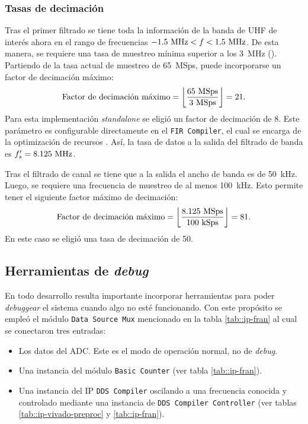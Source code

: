 \documentclass[../../main.tex]{subfiles}
\begin{document}
\subsubsection{Tasas de decimación}
Tras el primer filtrado se tiene toda la información de la banda de UHF de interés ahora en el rango de frecuencias $-1.5~\textrm{MHz}<f<1.5~\textrm{MHz}$. De esta manera, se requiere una tasa de muestreo mínima superior a los 3~MHz (\cite{teorema-del-muestreo}). Partiendo de la tasa actual de muestreo de 65~MSps, puede incorporarse un factor de decimación máximo:
\[\textrm{Factor de decimación máximo} = \left\lfloor\frac{65~\textrm{MSps}}{3~\textrm{MSps}}\right\rfloor = 21.\]
Para esta implementación \textit{standalone} se eligió un factor de decimación de 8. Este parámetro es configurable directamente en el \texttt{FIR Compiler}, el cual se encarga de la optimización de recursos \cite{fir-compiler}. Así, la tasa de datos a la salida del filtrado de banda es $f'_s = 8.125~\textrm{MHz}$.

Tras el filtrado de canal se tiene que a la salida el ancho de banda es de 50~kHz. Luego, se requiere una frecuencia de muestreo de al menos 100~kHz. Esto permite tener el siguiente factor máximo de decimación:
\[\textrm{Factor de decimación máximo} = \left\lfloor\frac{8.125~\textrm{MSps}}{100~\textrm{kSps}}\right\rfloor = 81.\] En este caso se eligió una tasa de decimación de 50.


\subsection{Herramientas de \textit{debug}}\label{subsec::debug-preproc-inicial}
En todo desarrollo resulta importante incorporar herramientas para poder \textit{debuggear} el sistema cuando algo no esté funcionando. Con este propósito se empleó el módulo \texttt{Data Source Mux} mencionado en la tabla \ref{tab::ip-fran} al cual se conectaron tres entradas:
\begin{itemize}
    \item Los datos del ADC. Este es el modo de operación normal, no de \textit{debug}.
    \item Una instancia del módulo \texttt{Basic Counter} (ver tabla \ref{tab::ip-fran}).
    \item Una instancia del IP \texttt{DDS Compiler} oscilando a una frecuencia conocida y controlado mediante una instancia de \texttt{DDS Compiler Controller} (ver tablas \ref{tab::ip-vivado-preproc} y \ref{tab::ip-fran}).
\end{itemize}
\end{document}
